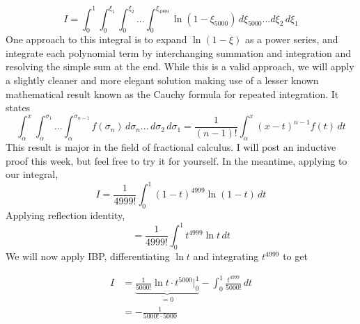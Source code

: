 \documentclass{article}
\begin{document}
\begin{equation*}
I=\int_{0}^{1}\int_{0}^{\xi_1}\int_{0}^{\xi_2}...\int_{0}^{\xi_{4999}} \ln(1-\xi_{5000})\,d\xi_{5000}...d\xi_{2}\,d\xi_{1}
\end{equation*}
One approach to this integral is to expand $\ln(1-\xi)$ as a power series, and integrate each polynomial term by interchanging summation and integration and resolving the simple sum at the end. While this is a valid approach, we will apply a slightly cleaner and more elegant solution making use of a lesser known mathematical result known as the Cauchy formula for repeated integration. It states
\begin{equation*}
    \int_{\alpha}^{x}\int_{\alpha}^{\sigma_1}...\int_{\alpha}^{\sigma_{n-1}}f(\sigma_{n})\,d\sigma_{n}...\,d\sigma_{2}\,d\sigma_1=\frac{1}{(n-1)!}\int_{\alpha}^{x}(x-t)^{n-1}f(t)\,dt
\end{equation*}
This result is major in the field of fractional calculus. I will post an inductive proof this week, but feel free to try it for yourself. In the meantime, applying to our integral,
\begin{equation*}
    I=\frac{1}{4999!}\int_{0}^{1} (1-t)^{4999}\ln(1-t)\,dt
\end{equation*}
Applying reflection identity,
\begin{equation*}
    =\frac{1}{4999!}\int_{0}^{1} t^{4999}\ln{t}\,dt
\end{equation*}
We will now apply IBP, differentiating $\ln{t}$ and integrating $t^{4999}$ to get 

\begin{equation*}
    \begin{split}
        I&=\underbrace{\frac{1}{5000!}\ln{t}\cdot  t^{5000}\Big|_{0}^{1}}_{=0}-\int_{0}^{1} \frac{t^{4999}}{5000!} \,dt\\
        &= -\frac{1}{5000!\cdot 5000}
    \end{split}
  
\end{equation*}
\end{document}
